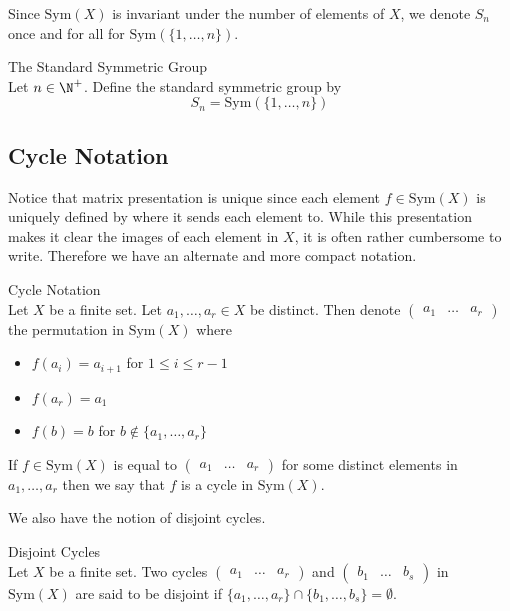 \documentclass[a4paper]{article}
\begin{document}
Since $\text{Sym}(X)$ is invariant under the number of elements of $X$, we denote $S_n$ once and for all for $\text{Sym}(\{1,\dots,n\})$. 

\begin{defn}{The Standard Symmetric Group}{}\\
Let $n\in\N^+$. Define the standard symmetric group by $$S_n=\text{Sym}\left(\{1,\dots,n\}\right)$$
\end{defn}

\subsection{Cycle Notation}
Notice that matrix presentation is unique since each element $f\in\text{Sym}(X)$ is uniquely defined by where it sends each element to. While this presentation makes it clear the images of each element in $X$, it is often rather cumbersome to write. Therefore we have an alternate and more compact notation. 

\begin{defn}{Cycle Notation}{}\\
Let $X$ be a finite set. Let $a_1,\dots,a_r\in X$ be distinct. Then denote $\begin{pmatrix}a_1 & \dots & a_r\end{pmatrix}$ the permutation in $\text{Sym}(X)$ where 
\begin{itemize}
\item $f(a_i)=a_{i+1}$ for $1\leq i\leq r-1$
\item $f(a_r)=a_1$
\item $f(b)=b$ for $b\notin\{a_1,\dots,a_r\}$
\end{itemize}
If $f\in\text{Sym}(X)$ is equal to $\begin{pmatrix}a_1 & \dots & a_r\end{pmatrix}$ for some distinct elements in $a_1,\dots,a_r$ then we say that $f$ is a cycle in $\text{Sym}(X)$. 
\end{defn}

We also have the notion of disjoint cycles. 

\begin{defn}{Disjoint Cycles}{}\\
Let $X$ be a finite set. Two cycles $\begin{pmatrix}a_1 & \dots & a_r\end{pmatrix}$ and $\begin{pmatrix}b_1 & \dots & b_s\end{pmatrix}$ in $\text{Sym}(X)$ are said to be disjoint if $\{a_1,\dots,a_r\}\cap\{b_1,\dots,b_s\}=\emptyset$. 
\end{defn}
\end{document}
